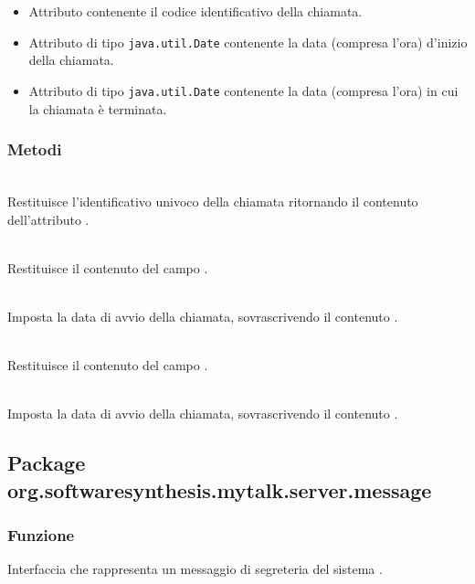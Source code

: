 \begin{itemize}
	\item{}
	Attributo contenente il codice identificativo della chiamata.
	\item{}
	Attributo di tipo \texttt{java.util.Date} contenente la data (compresa l'ora) d'inizio della chiamata.
	\item{}
	Attributo di tipo \texttt{java.util.Date} contenente la data (compresa l'ora) in cui la chiamata è terminata.
\end{itemize}

\subsubsection*{Metodi}
\begin{description}
	\item{}\\
	Restituisce l'identificativo univoco della chiamata ritornando il contenuto dell'attributo .
	\item{}\\
	Restituisce il contenuto del campo .
	\item{}\\
	Imposta la data di avvio della chiamata, sovrascrivendo il contenuto .
	\item{}\\
	Restituisce il contenuto del campo .
	\item{}\\
	Imposta la data di avvio della chiamata, sovrascrivendo il contenuto .
\end{description}

\subsection{Package org.softwaresynthesis.mytalk.server.message}\label{sec:message}


\subsubsection*{Funzione}
Interfaccia che rappresenta un messaggio di segreteria del sistema \caName.

